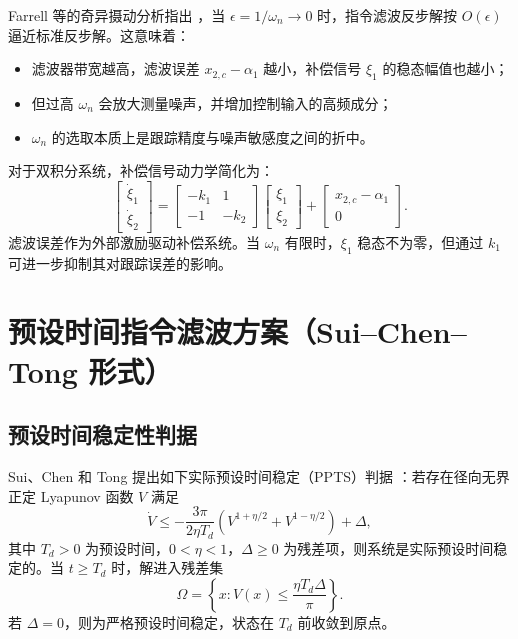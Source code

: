 \documentclass[UTF8,a4paper,11pt]{ctexart}
\begin{document}
Farrell 等的奇异摄动分析指出 \cite{Farrell2009CFB}，当 $\epsilon = 1/\omega_n \to 0$ 时，指令滤波反步解按 $O(\epsilon)$ 逼近标准反步解。这意味着：
\begin{itemize}
  \item 滤波器带宽越高，滤波误差 $x_{2,c} - \alpha_1$ 越小，补偿信号 $\xi_1$ 的稳态幅值也越小；
  \item 但过高 $\omega_n$ 会放大测量噪声，并增加控制输入的高频成分；
  \item $\omega_n$ 的选取本质上是跟踪精度与噪声敏感度之间的折中。
\end{itemize}

对于双积分系统，补偿信号动力学简化为：
\begin{equation}
\begin{bmatrix} \dot{\xi}_1 \\ \dot{\xi}_2 \end{bmatrix}
= \begin{bmatrix} -k_1 & 1 \\ -1 & -k_2 \end{bmatrix}
\begin{bmatrix} \xi_1 \\ \xi_2 \end{bmatrix}
+ \begin{bmatrix} x_{2,c} - \alpha_1 \\ 0 \end{bmatrix}.
\end{equation}
滤波误差作为外部激励驱动补偿系统。当 $\omega_n$ 有限时，$\xi_1$ 稳态不为零，但通过 $k_1$ 可进一步抑制其对跟踪误差的影响。

\section{预设时间指令滤波方案（Sui--Chen--Tong 形式）}

\subsection{预设时间稳定性判据}

Sui、Chen 和 Tong 提出如下实际预设时间稳定（PPTS）判据 \cite{Sui2024Predefined}：若存在径向无界正定 Lyapunov 函数 $V$ 满足
\begin{equation}
\label{eq:ppts}
\dot{V} \leq -\frac{3\pi}{2\eta T_d}\left(V^{1+\eta/2} + V^{1-\eta/2}\right) + \Delta,
\end{equation}
其中 $T_d > 0$ 为预设时间，$0 < \eta < 1$，$\Delta \geq 0$ 为残差项，则系统是实际预设时间稳定的。当 $t \geq T_d$ 时，解进入残差集
\begin{equation}
\Omega = \left\{x : V(x) \leq \frac{\eta T_d \Delta}{\pi}\right\}.
\end{equation}
若 $\Delta = 0$，则为严格预设时间稳定，状态在 $T_d$ 前收敛到原点。
\end{document}
